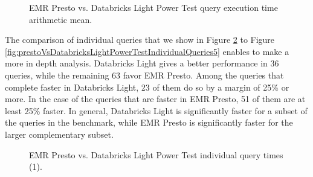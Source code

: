 \begin{figure}
   \begin{center}
   \end{center}
   \caption{EMR Presto vs. Databricks Light Power Test query execution time arithmetic mean.}
   \label{fig:prestoVsDatabricksLightPowerTestArithmeticMean}
\end{figure}

The comparison of individual queries that we show in Figure \ref{fig:prestoVsDatabricksLightPowerTestIndividualQueries1} to Figure \ref{fig:prestoVsDatabricksLightPowerTestIndividualQueries5} enables to make a more in depth analysis. Databricks Light gives a better performance in 36 queries, while the remaining 63 favor EMR Presto. Among the queries that complete faster in Databricks Light, 23 of them do so by a margin of 25\% or more. In the case of the queries that are faster in EMR Presto, 51 of them are at least 25\% faster. In general, Databricks Light is significantly faster for a subset of the queries in the benchmark, while EMR Presto is significantly faster for the larger complementary subset.

\begin{figure}
   \begin{center}
   \end{center}
   \caption{EMR Presto vs. Databricks Light Power Test individual query times (1).}
   \label{fig:prestoVsDatabricksLightPowerTestIndividualQueries1}
\end{figure}

